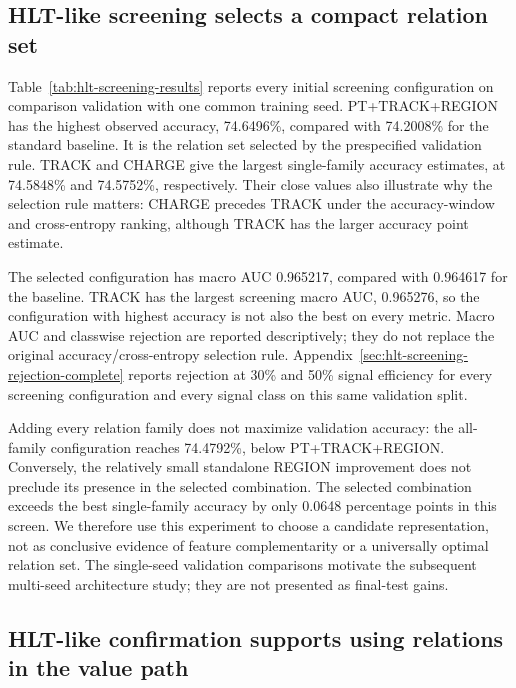 \subsection{HLT-like screening selects a compact relation set}
\label{sec:hlt-screening-results}

Table~\ref{tab:hlt-screening-results} reports every initial screening
configuration on comparison validation with one common training seed. PT+TRACK+REGION has the
highest observed accuracy, 74.6496\%, compared with 74.2008\% for the
standard baseline. It is the relation set selected by the prespecified
validation rule. TRACK and CHARGE give the largest single-family accuracy
estimates, at 74.5848\% and 74.5752\%, respectively. Their close values also
illustrate why the selection rule matters: CHARGE precedes TRACK under the
accuracy-window and cross-entropy ranking, although TRACK has the larger
accuracy point estimate.



The selected configuration has macro AUC 0.965217, compared with 0.964617
for the baseline. TRACK has the largest screening macro AUC, 0.965276,
so the configuration with highest accuracy is not also the best on every
metric. Macro AUC and classwise rejection are reported descriptively;
they do not replace the original accuracy/cross-entropy selection rule.
Appendix~\ref{sec:hlt-screening-rejection-complete} reports rejection at
30\% and 50\% signal efficiency for every screening configuration and
every signal class on this same validation split.

Adding every relation family does not maximize validation accuracy: the
all-family configuration reaches 74.4792\%, below PT+TRACK+REGION. Conversely,
the relatively small standalone REGION improvement does not preclude its
presence in the selected combination. The selected combination exceeds the
best single-family accuracy by only 0.0648 percentage points in this screen.
We therefore use this experiment to choose a candidate representation, not
as conclusive evidence of feature complementarity or a universally optimal
relation set. The single-seed validation comparisons motivate the subsequent
multi-seed architecture study; they are not presented as final-test gains.

\subsection{HLT-like confirmation supports using relations in the value path}
\label{sec:hlt-architecture-results}

